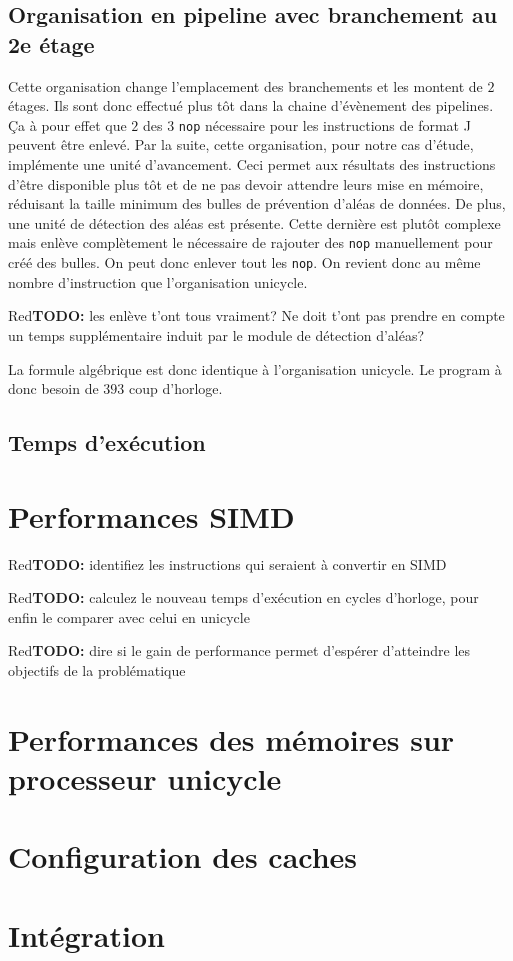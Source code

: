 \documentclass[a11paper]{article}
\newcommand{\todo}[1]{\begin{color}{Red}\textbf{TODO:} #1\end{color}}
\begin{document}
\subsection{Organisation en pipeline avec branchement au 2e étage}
Cette organisation change l'emplacement des branchements et les montent de $2$ étages. Ils sont donc effectué plus tôt dans la chaine d'évènement des pipelines. Ça à pour effet que
$2$ des $3$ \verb|nop| nécessaire pour les instructions de format J peuvent être enlevé. Par la suite, cette organisation, pour notre cas d'étude, implémente une unité d'avancement.
Ceci permet aux résultats des instructions d'être disponible plus tôt et de ne pas devoir attendre leurs mise en mémoire, réduisant la taille minimum des bulles de prévention d'aléas
de données. De plus, une unité de détection des aléas est présente. Cette dernière est plutôt complexe mais enlève complètement le nécessaire de rajouter des \verb|nop| manuellement
pour créé des bulles. On peut donc enlever tout les \verb|nop|. On revient donc au même nombre d'instruction que l'organisation unicycle.

\todo{les enlève t'ont tous vraiment? Ne doit t'ont pas prendre en compte un temps supplémentaire induit par le module de détection d'aléas?}

La formule algébrique est donc identique à l'organisation unicycle. Le program à donc besoin de $393$ coup d'horloge.


\subsection{Temps d'exécution}





\section{Performances SIMD}

\todo{identifiez les instructions qui seraient à convertir en SIMD}

\todo{calculez le nouveau temps d'exécution en cycles d'horloge, pour enfin le
comparer avec celui en unicycle}

\todo{dire si le gain de performance permet d'espérer d'atteindre les objectifs
de la problématique}

\section{Performances des mémoires sur processeur unicycle}

\section{Configuration des caches}

\section{Intégration}
\end{document}
